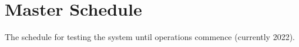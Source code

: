 
\section{Master Schedule\label{sect:schedule}}

The schedule for testing the system until operations commence (currently 2022). 


